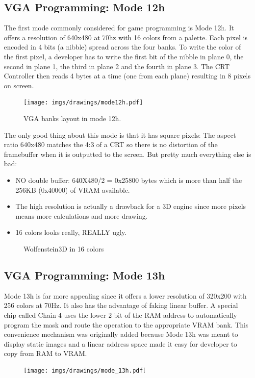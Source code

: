\documentclass[book.tex]{subfiles}
\begin{document}
 \subsection{VGA Programming: Mode 12h}
 The first mode commonly considered for game programming is Mode 12h. It offers a resolution of 640x480 at 70hz with 16 colors from a palette. Each pixel is encoded in 4 bits (a nibble) spread across the four banks. To write the color of the first pixel, a developer has to write the first bit of the nibble in plane 0, the second in plane 1, the third in plane 2 and the fourth in plane 3. The CRT Controller then reads 4 bytes at a time (one from each plane) resulting in 8 pixels on screen.\\
\par
\begin{figure}[H]
\centering
 \texttt{[image: imgs/drawings/mode12h.pdf]}
\caption{VGA banks layout in mode 12h.}
\end{figure}
\par

The only good thing about this mode is that it has square pixels: The aspect ratio 640x480 matches the 4:3 of a CRT so there is no distortion of the framebuffer when it is outputted to the screen. But pretty much everything else is bad:\\
\begin{itemize}
\item NO double buffer: 640X480/2 = 0x25800 bytes which is more than half the 256KB (0x40000) of VRAM available.
\item The high resolution is actually a drawback for a 3D engine since more pixels means more calculations and more drawing.
\item 16 colors looks really, REALLY ugly.
\end{itemize}

 \begin{figure}[H]
\centering
 \caption{Wolfenstein3D in 16 colors}
\end{figure}





 
  \subsection{VGA Programming: Mode 13h}
  Mode 13h is far more appealing since it offers a lower resolution of 320x200 with 256 colors at 70Hz. It also has the advantage of faking linear buffer. A special chip called Chain-4 uses the lower 2 bit of the RAM address to automatically program the mask and route the operation to the appropriate VRAM bank. This convenience mechanism was originally added because Mode 13h was meant to display static images and a linear address space made it easy for developer to copy from RAM to VRAM.\\
  \par
 \begin{figure}[H]
\centering
      \texttt{[image: imgs/drawings/mode\_13h.pdf]}
\end{figure}
\par
\end{document}
